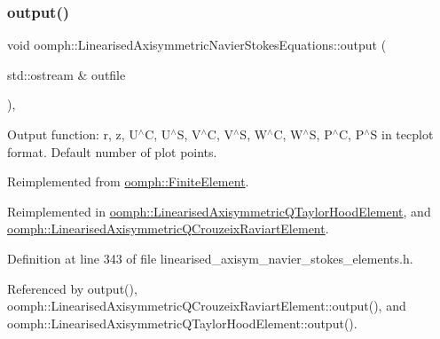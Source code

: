 \mbox{\label{classoomph_1_1LinearisedAxisymmetricNavierStokesEquations_a70e8f2426b53160afabe2f6dce78b920}} 
\subsubsection{\texorpdfstring{output()}{output()}\hspace{0.1cm}{\footnotesize\ttfamily [1/4]}}
{\footnotesize\ttfamily void oomph\+::\+Linearised\+Axisymmetric\+Navier\+Stokes\+Equations\+::output (\begin{DoxyParamCaption}\item[{std\+::ostream \&}]{outfile }\end{DoxyParamCaption})\hspace{0.3cm}{\ttfamily [inline]}, {\ttfamily [virtual]}}



Output function\+: r, z, U$^\wedge$C, U$^\wedge$S, V$^\wedge$C, V$^\wedge$S, W$^\wedge$C, W$^\wedge$S, P$^\wedge$C, P$^\wedge$S in tecplot format. Default number of plot points. 



Reimplemented from \hyperlink{classoomph_1_1FiniteElement_a2ad98a3d2ef4999f1bef62c0ff13f2a7}{oomph\+::\+Finite\+Element}.



Reimplemented in \hyperlink{classoomph_1_1LinearisedAxisymmetricQTaylorHoodElement_a00768ef22cca932f04e2e10b0f779c48}{oomph\+::\+Linearised\+Axisymmetric\+Q\+Taylor\+Hood\+Element}, and \hyperlink{classoomph_1_1LinearisedAxisymmetricQCrouzeixRaviartElement_ae89fb3e2f320a51ef7904b09a480ee89}{oomph\+::\+Linearised\+Axisymmetric\+Q\+Crouzeix\+Raviart\+Element}.



Definition at line 343 of file linearised\+\_\+axisym\+\_\+navier\+\_\+stokes\+\_\+elements.\+h.



Referenced by output(), oomph\+::\+Linearised\+Axisymmetric\+Q\+Crouzeix\+Raviart\+Element\+::output(), and oomph\+::\+Linearised\+Axisymmetric\+Q\+Taylor\+Hood\+Element\+::output().

